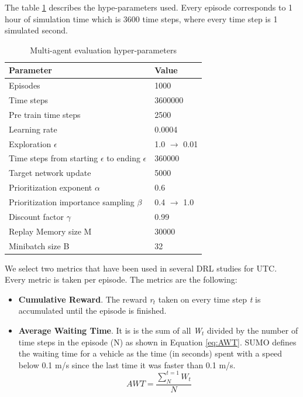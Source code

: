 \documentclass{llncs}
\begin{document}
The table \ref{tab:MARLhyp} describes the hype-parameters used. Every episode corresponds to 1 hour of simulation time which is 3600 time steps, where every time step is 1 simulated second.

\begin{table}
\centering
\caption{Multi-agent evaluation hyper-parameters}
 \begin{tabularx}{\columnwidth}{X|X}
 \hline
 Parameter & Value \\ [0.5ex] 
 \hline
 \hline
 Episodes & 1000 \\
 Time steps & 3600000 \\
 Pre train time steps & 2500 \\
 Learning rate & 0.0004 \\
 Exploration $\epsilon$ & 1.0 $\rightarrow$ 0.01 \\
 Time steps from starting $\epsilon$ to ending $\epsilon$ & 360000 \\
 Target network update & 5000 \\
 Prioritization exponent $\alpha$ & 0.6 \\
 Prioritization importance sampling $\beta$ & 0.4 $\rightarrow$ 1.0 \\
 Discount factor $\gamma$ & 0.99 \\
 Replay Memory size M & 30000 \\
 Minibatch size B & 32 \\
 \hline
\end{tabularx}
\label{tab:MARLhyp}
\end{table}

We select two metrics that have been used in several DRL studies for UTC. Every metric is taken per episode. The metrics are the following:

\begin{itemize}
	\item \textbf{Cumulative Reward}. The reward \textit{r$_{t}$} taken on every time step \textit{t} is accumulated until the episode is finished.
	
	\item \textbf{Average Waiting Time}. It is is the sum of all \textit{W$_{t}$} divided by the number of time steps in the episode (N) as shown in Equation \ref{eq:AWT}. SUMO defines the waiting time for a vehicle as the time (in seconds) spent with a speed below 0.1 m/s since the last time it was faster than 0.1 m/s.
\begin{equation}\label{eq:AWT}
AWT = \frac{\sum^{t=1}_{N}{W_{t}}}{N}
\end{equation}
\end{itemize}
\end{document}
